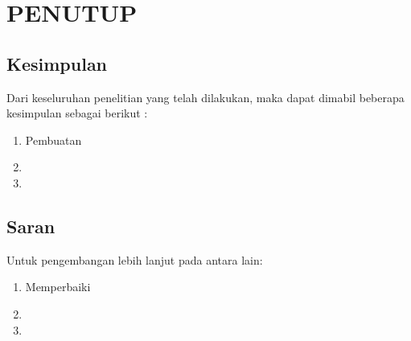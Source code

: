 \chapter{PENUTUP}
\label{chap:penutup}


\section{Kesimpulan}
\label{sec:kesimpulan}

Dari keseluruhan penelitian yang telah dilakukan, maka dapat dimabil beberapa kesimpulan sebagai berikut :

\begin{enumerate}[nolistsep]

  \item Pembuatan \lipsum[2][1-3]

  \item \lipsum[2][4-6]

  \item \lipsum[2][7-10]

\end{enumerate}

\section{Saran}
\label{chap:saran}

Untuk pengembangan lebih lanjut pada \lipsum[1][1-3] antara lain:

\begin{enumerate}[nolistsep]

  \item Memperbaiki \lipsum[2][1-3]

  \item \lipsum[2][4-6]

  \item \lipsum[2][7-10]

\end{enumerate}
